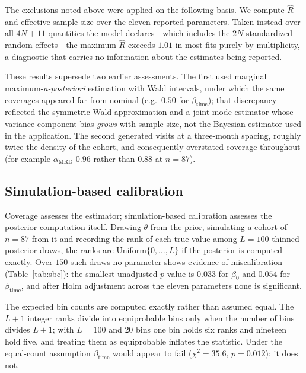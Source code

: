 \documentclass[11pt]{article}
\begin{document}
The exclusions noted above were applied on the following basis. We compute
$\widehat R$ and effective sample size over the eleven reported
parameters. Taken instead over all $4N+11$ quantities the model declares---which
includes the $2N$ standardized random effects---the maximum $\widehat R$ exceeds
$1.01$ in most fits purely by multiplicity, a diagnostic that carries no
information about the estimates being reported.

These results supersede two earlier assessments. The first used marginal
maximum-\emph{a-posteriori} estimation with Wald intervals, under which the same
coverages appeared far from nominal (e.g.\ $0.50$ for $\beta_{\mathrm{time}}$);
that discrepancy reflected the symmetric Wald approximation and a joint-mode
estimator whose variance-component bias \emph{grows} with sample size, not the
Bayesian estimator used in the application. The second generated visits at a
three-month spacing, roughly twice the density of the cohort, and consequently
overstated coverage throughout (for example $\alpha_{\mathrm{MRD}}$ $0.96$
rather than $0.88$ at $n=87$).



\subsection{Simulation-based calibration}
\label{sec:sim:sbc}

Coverage assesses the estimator; simulation-based calibration assesses the
posterior computation itself. Drawing $\theta$ from the prior, simulating a
cohort of $n=87$ from it and recording the rank of each true value among $L=100$
thinned posterior draws, the ranks are Uniform$\{0,\dots,L\}$ if the posterior is
computed exactly. Over $150$ such draws no parameter shows evidence of
miscalibration (Table~\ref{tab:sbc}): the smallest unadjusted $p$-value is
$0.033$ for $\beta_0$ and $0.054$ for $\beta_{\mathrm{time}}$, and after Holm
adjustment across the eleven parameters none is significant.

The expected bin counts are computed exactly rather than assumed equal. The
$L+1$ integer ranks divide into equiprobable bins only when the number of bins
divides $L+1$; with $L=100$ and $20$ bins one bin holds six ranks and nineteen
hold five, and treating them as equiprobable inflates the statistic. Under the
equal-count assumption $\beta_{\mathrm{time}}$ would appear to fail
($\chi^2=35.6$, $p=0.012$); it does not.


\end{document}
